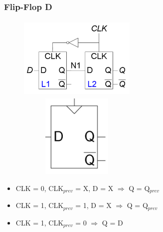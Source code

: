 \documentclass{report}
\begin{document}
        \subsubsection{Flip-Flop D}
            \begin{center}
                \begin{figure}[H]
                    \includegraphics[width=0.5\textwidth, height=4cm]{flipflopd.png}
                    \includegraphics[width=0.5\textwidth, height=4cm]{flipflopd2.png}
                \end{figure}
            \end{center}
            \begin{itemize}
                \item CLK = 0, CLK$_{prev}$ = X, D = X $\Longrightarrow$ Q = Q$_{prev}$
                \item CLK = 1, CLK$_{prev}$ = 1, D = X $\Longrightarrow$ Q = Q$_{prev}$
                \item CLK = 1, CLK$_{prev}$ = 0 $\Longrightarrow$ Q = D
            \end{itemize}
\end{document}
